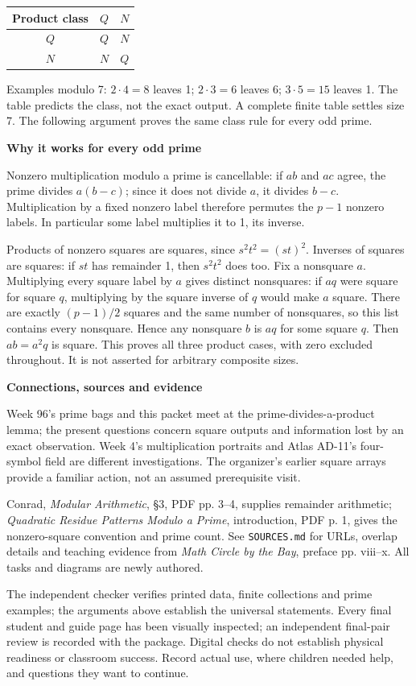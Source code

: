 \documentclass[11pt]{article}
\newcommand{\sub}[1]{\par\textbf{#1}\par}
\begin{document}
\begin{center}\renewcommand{\arraystretch}{1.2}
\begin{tabular}{c|cc}
Product class & $Q$ & $N$\\\hline
$Q$ & $Q$ & $N$\\
$N$ & $N$ & $Q$
\end{tabular}\end{center}
Examples modulo 7: $2\cdot4=8$ leaves 1; $2\cdot3=6$ leaves 6; $3\cdot5=15$ leaves 1. The table predicts the class, not the exact output. A complete finite table settles size 7. The following argument proves the same class rule for every odd prime.

\sub{Why it works for every odd prime}
Nonzero multiplication modulo a prime is cancellable: if $ab$ and $ac$ agree, the prime divides $a(b-c)$; since it does not divide $a$, it divides $b-c$. Multiplication by a fixed nonzero label therefore permutes the $p-1$ nonzero labels. In particular some label multiplies it to 1, its inverse.

Products of nonzero squares are squares, since $s^2t^2=(st)^2$. Inverses of squares are squares: if $st$ has remainder 1, then $s^2t^2$ does too. Fix a nonsquare $a$. Multiplying every square label by $a$ gives distinct nonsquares: if $aq$ were square for square $q$, multiplying by the square inverse of $q$ would make $a$ square. There are exactly $(p-1)/2$ squares and the same number of nonsquares, so this list contains every nonsquare. Hence any nonsquare $b$ is $aq$ for some square $q$. Then $ab=a^2q$ is square. This proves all three product cases, with zero excluded throughout. It is not asserted for arbitrary composite sizes.

\sub{Connections, sources and evidence}
Week 96's prime bags and this packet meet at the prime-divides-a-product lemma; the present questions concern square outputs and information lost by an exact observation. Week 4's multiplication portraits and Atlas AD-11's four-symbol field are different investigations. The organizer's earlier square arrays provide a familiar action, not an assumed prerequisite visit.

Conrad, \emph{Modular Arithmetic}, \S3, PDF pp. 3--4, supplies remainder arithmetic; \emph{Quadratic Residue Patterns Modulo a Prime}, introduction, PDF p. 1, gives the nonzero-square convention and prime count. See \texttt{SOURCES.md} for URLs, overlap details and teaching evidence from \emph{Math Circle by the Bay}, preface pp. viii--x. All tasks and diagrams are newly authored.

The independent checker verifies printed data, finite collections and prime examples; the arguments above establish the universal statements. Every final student and guide page has been visually inspected; an independent final-pair review is recorded with the package. Digital checks do not establish physical readiness or classroom success. Record actual use, where children needed help, and questions they want to continue.
\end{document}
